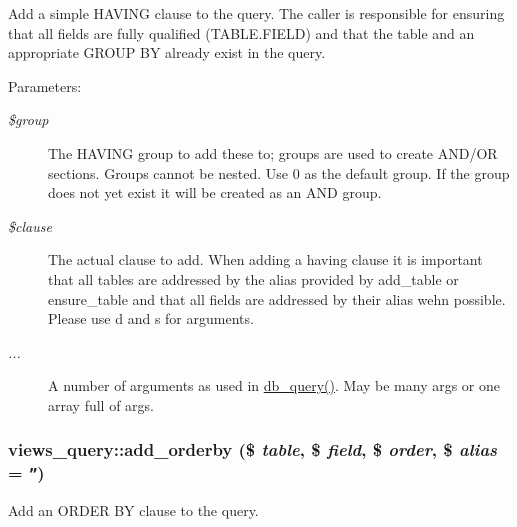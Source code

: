 Add a simple HAVING clause to the query. The caller is responsible for ensuring that all fields are fully qualified (TABLE.FIELD) and that the table and an appropriate GROUP BY already exist in the query.

\begin{Desc}
\item[Parameters:]
\begin{description}
\item[{\em \$group}]The HAVING group to add these to; groups are used to create AND/OR sections. Groups cannot be nested. Use 0 as the default group. If the group does not yet exist it will be created as an AND group. \item[{\em \$clause}]The actual clause to add. When adding a having clause it is important that all tables are addressed by the alias provided by add\_\-table or ensure\_\-table and that all fields are addressed by their alias wehn possible. Please use d and s for arguments. \item[{\em ...}]A number of arguments as used in \hyperlink{database_8mysql-common_8inc_9e096321b86945d128746ac7bedce8f3}{db\_\-query()}. May be many args or one array full of args. \end{description}
\end{Desc}
\hypertarget{classviews__query_d6ad02de9d393f27da6b998ff54a91ec}{
\subsubsection[{add\_\-orderby}]{\setlength{\rightskip}{0pt plus 5cm}views\_\-query::add\_\-orderby (\$ {\em table}, \/  \$ {\em field}, \/  \$ {\em order}, \/  \$ {\em alias} = {\tt ''})}}
\label{classviews__query_d6ad02de9d393f27da6b998ff54a91ec}


Add an ORDER BY clause to the query.

